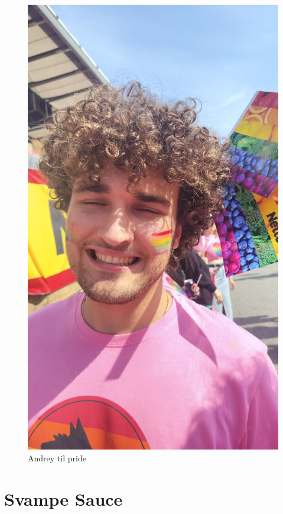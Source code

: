 \documentclass{book}
\begin{document}
\begin{figure}
    \centering
    \includegraphics[width=0.5\linewidth]{Andrey.jpg}
    \caption{Andrey til pride}
\end{figure}
\newpage \section{Svampe Sauce}
\end{document}

